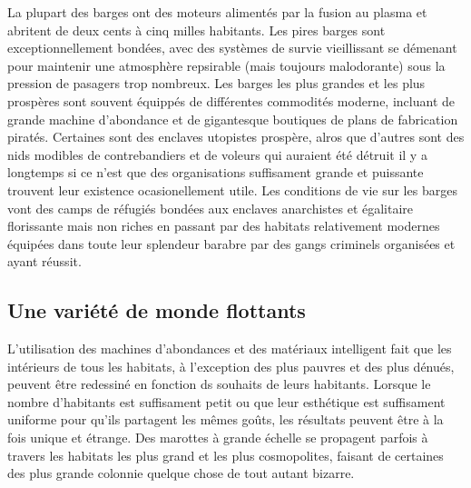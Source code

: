 La plupart des barges ont des moteurs alimentés par la fusion au plasma et abritent de deux cents à cinq milles habitants. Les pires barges sont exceptionnellement bondées, avec des systèmes de survie vieillissant se démenant pour maintenir une atmosphère repsirable (mais toujours malodorante) sous la pression de pasagers trop nombreux. Les barges les plus grandes et les plus prospères sont souvent équippés de différentes commodités moderne, incluant de grande machine d'abondance et de gigantesque boutiques de plans de fabrication piratés. Certaines sont des enclaves utopistes prospère, alros que d'autres sont des nids modibles de contrebandiers et de voleurs qui auraient été détruit il y a longtemps si ce n'est que des organisations suffisament grande et puissante trouvent leur existence ocasionellement utile. Les conditions de vie sur les barges vont des camps de réfugiés bondées aux enclaves anarchistes et égalitaire florissante mais non riches en passant par des habitats relativement modernes équipées dans toute leur splendeur barabre par des gangs criminels organisées et ayant réussit. 

\subsection{Une variété de monde flottants} \label{sec:divers-float-worlds} 

L'utilisation des machines d'abondances et des matériaux intelligent fait que les intérieurs de tous les habitats, à l'exception des plus pauvres et des plus dénués, peuvent être redessiné en fonction ds souhaits de leurs habitants. Lorsque le nombre d'habitants est suffisament petit ou que leur esthétique est suffisament uniforme pour qu'ils partagent les mêmes goûts, les résultats peuvent être à la fois unique et étrange. Des marottes à grande échelle se propagent parfois à travers les habitats les plus grand et les plus cosmopolites, faisant de certaines des plus grande colonnie quelque chose de tout autant bizarre. 

